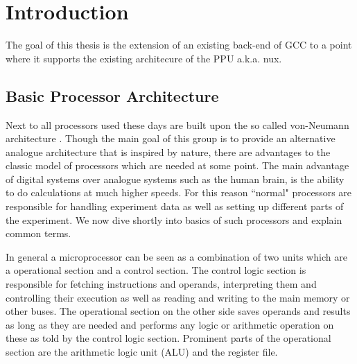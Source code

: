 \chapter{Introduction}
\label{chapter:introduction}

The goal of this thesis is the extension of an existing back-end of GCC to a point where it supports the existing architecure of the PPU a.k.a. nux.

\section{Basic Processor Architecture}
\label{section:processor}

Next to all processors used these days are built upon the so called von-Neumann architecture .
Though the main goal of this group is to provide an alternative analogue architecture that is inspired by nature, there are advantages to the classic model of processors which are needed at some point.
The main advantage of digital systems over analogue systems such as the human brain, is the ability to do calculations at much higher speeds.
For this reason ``normal" processors are responsible for handling experiment data as well as setting up different parts of the experiment.
We now dive shortly into basics of such processors and explain common terms.

In general a microprocessor can be seen as a combination of two units which are a operational section and a control section.
The control logic section is responsible for fetching instructions and operands, interpreting them and controlling their execution as well as reading and writing to the main memory or other buses.
The operational section on the other side saves operands and results as long as they are needed and performs any logic or arithmetic operation on these as told by the control logic section.
Prominent parts of the operational section are the arithmetic logic unit (ALU) and the register file.

